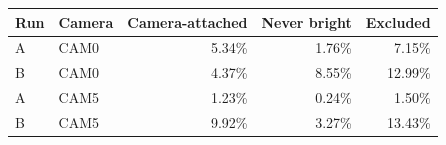 \begin{tabularx}{\textwidth}{@{}llrrr@{}}
\toprule
Run & Camera & Camera-attached & Never bright & Excluded \\
\midrule
A & CAM0 & 5.34\% & 1.76\% & 7.15\% \\
B & CAM0 & 4.37\% & 8.55\% & 12.99\% \\
A & CAM5 & 1.23\% & 0.24\% & 1.50\% \\
B & CAM5 & 9.92\% & 3.27\% & 13.43\% \\
\bottomrule
\end{tabularx}